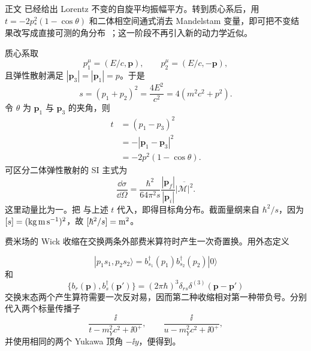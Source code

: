 \begin{derivation}

正文 已经给出 Lorentz 不变的自旋平均振幅平方。转到质心系后，用 $t=-2p_*^2(1-\cos\theta)$ 和二体相空间通式消去 Mandelstam 变量，即可把不变结果改写成直接可测的角分布~；这一阶段不再引入新的动力学近似。

质心系取
\begin{equation*}
 p_1^\mu=(E/c,\mathbf p),\qquad
 p_2^\mu=(E/c,-\mathbf p),
\end{equation*}
且弹性散射满足 $|\mathbf p_3|=|\mathbf p_1|=p$。于是
\begin{equation*}
 s=(p_1+p_2)^2=\frac{4E^2}{c^2}=4(m^2c^2+p^2).
\end{equation*}
令 $\theta$ 为 $\mathbf p_1$ 与 $\mathbf p_3$ 的夹角，则
\begin{align*}
 t&=(p_1-p_3)^2\\
  &=-|\mathbf p_1-\mathbf p_3|^2\\
  &=-2p^2(1-\cos\theta).
\end{align*}
可区分二体弹性散射的 SI 主式为
\begin{equation*}
 \frac{\dd\sigma}{\dd\Omega}
 =\frac{\hbar^2}{64\pi^2s}
 \frac{|\mathbf p_f|}{|\mathbf p_i|}
 \overline{|\mathcal M|^2}.
\end{equation*}
这里动量比为一。把 与上述 $t$ 代入，即得目标角分布。截面量纲来自 $\hbar^2/s$，因为 $[s]=({\rm kg\,m\,s^{-1}})^2$，故 $[\hbar^2/s]={\rm m^2}$。
\end{derivation}

\begin{derivation}[费米子交换为何产生相对负号]
费米场的 Wick 收缩在交换两条外部费米算符时产生一次奇置换。用外态定义

\begin{equation*}
 |p_1s_1,p_2s_2\rangle
 =b_{s_1}^\dagger(p_1)b_{s_2}^\dagger(p_2)|0\rangle
\end{equation*}
和
\begin{equation*}
 \{b_r(\mathbf p),b_s^\dagger(\mathbf p')\}
 =(2\pi\hbar)^3\delta_{rs}\delta^{(3)}(\mathbf p-\mathbf p')
\end{equation*}
交换末态两个产生算符需要一次反对易，因而第二种收缩相对第一种带负号。分别代入两个标量传播子
\begin{equation*}
 \frac{\ii}{t-m_Y^2c^2+\ii0^+},
 \qquad
 \frac{\ii}{u-m_Y^2c^2+\ii0^+},
\end{equation*}
并使用相同的两个 Yukawa 顶角 $-\ii y$，便得到。
\end{derivation}

